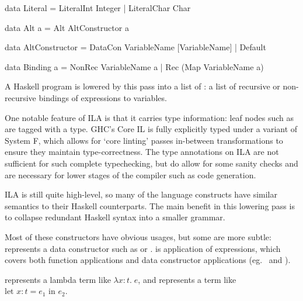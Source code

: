 \documentclass[dissertation.tex]{subfiles}
\begin{document}
{{{\begin{haskellfigure}
            data Literal = LiteralInt Integer
                         | LiteralChar Char

            data Alt a = Alt AltConstructor a

            data AltConstructor = DataCon VariableName [VariableName]
                                | Default

            data Binding a = NonRec VariableName a
                           | Rec (Map VariableName a)
            \end{haskellfigure}

            A Haskell program is lowered by this pass into a list of : a list of recursive or
            non-recursive bindings of expressions to variables.


            One notable feature of ILA is that it carries type information: leaf nodes such as  are
            tagged with a type. GHC's Core IL is fully explicitly typed under a variant of System F, which allows for
            `core linting' passes in-between transformations to ensure they maintain type-correctness. The type
            annotations on ILA are not sufficient for such complete typechecking, but do allow for some sanity checks
            and are necessary for lower stages of the compiler such as code generation. 

            ILA is still quite high-level, so many of the language constructs have similar semantics to their Haskell
            counterparts. The main benefit in this lowering pass is to collapse redundant Haskell syntax into a smaller
            grammar.

            Most of these constructors have obvious usages, but some are more subtle:  represents a data
            constructor such as  or .  is application of expressions, which
            covers both function applications and data constructor applications (eg.\  and ).

             represents a lambda term like \(\lambda x : t.\;e\), and  represents a term like \(\text{let } x:t = e_1 \text{ in } e_2\).

}}}
\end{document}
